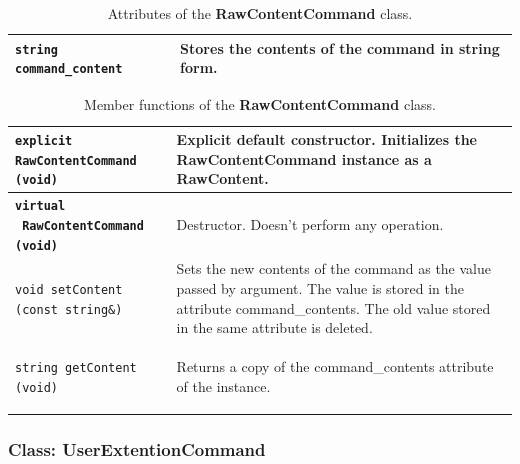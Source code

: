 \documentclass[11pt,twoside,openany,x11names,svgnames]{memoir}
\begin{document}
\begin{table}[h]\footnotesize
\centering
\begin{tabular}{| >{\bfseries}p{6.5cm} | p{9cm} |}
	\hline
	
	\texttt{string command\_content} & Stores the contents of the command in string form. \\

	\hline
\end{tabular}
\caption{Attributes of the \textbf{RawContentCommand} class.}
\label{tab:RawContentCommand-Attributes}
\end{table}

\begin{table}[h]\footnotesize
\centering
\begin{tabular}{| >{\bfseries}p{8.5cm} | p{7cm} |}
	\hline
	
	\texttt{explicit RawContentCommand (void)} & Explicit default constructor. Initializes the RawContentCommand instance as a RawContent. \\
	
	\hline
	
	\texttt{virtual ~RawContentCommand (void)} & Destructor. Doesn't perform any operation. \\
	
	\hline
	
	\texttt{void setContent (const string\&)} & Sets the new contents of the command as the value passed by argument. The value is stored in the attribute command\_contents. The old value stored in the same attribute is deleted. \\
	
	\hline	
	
	\texttt{string getContent (void)} & Returns a copy of the command\_contents attribute of the instance. \\
	
	\hline
\end{tabular}
\caption{Member functions of the \textbf{RawContentCommand} class.}
\label{tab:RawContentCommand-MemberFunctions}
\end{table}

\clearpage

\subsubsection{Class: UserExtentionCommand}\label{Class-UserExtentionCommand}
\end{document}
